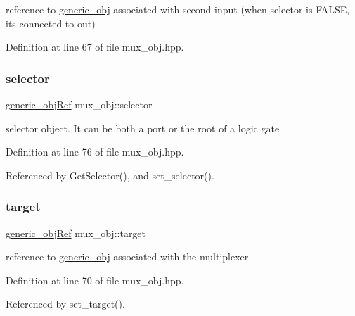 reference to \hyperlink{classgeneric__obj}{generic\+\_\+obj} associated with second input (when selector is F\+A\+L\+SE, it\textquotesingle{}s connected to out) 



Definition at line 67 of file mux\+\_\+obj.\+hpp.

\mbox{\label{classmux__obj_a0a211db0b9945ff54667d263c9bf4cdb}} 
\subsubsection{\texorpdfstring{selector}{selector}}
{\footnotesize\ttfamily \hyperlink{generic__obj_8hpp_acb533b2ef8e0fe72e09a04d20904ca81}{generic\+\_\+obj\+Ref} mux\+\_\+obj\+::selector\hspace{0.3cm}{\ttfamily [private]}}



selector object. It can be both a port or the root of a logic gate 



Definition at line 76 of file mux\+\_\+obj.\+hpp.



Referenced by Get\+Selector(), and set\+\_\+selector().

\mbox{\label{classmux__obj_a91e81a9c6b8894cadf3be9a497873948}} 
\subsubsection{\texorpdfstring{target}{target}}
{\footnotesize\ttfamily \hyperlink{generic__obj_8hpp_acb533b2ef8e0fe72e09a04d20904ca81}{generic\+\_\+obj\+Ref} mux\+\_\+obj\+::target\hspace{0.3cm}{\ttfamily [private]}}



reference to \hyperlink{classgeneric__obj}{generic\+\_\+obj} associated with the multiplexer 



Definition at line 70 of file mux\+\_\+obj.\+hpp.



Referenced by set\+\_\+target().

\mbox{\label{classmux__obj_a8060a8621b6a23897ec9b7f9de007e3a}} 
